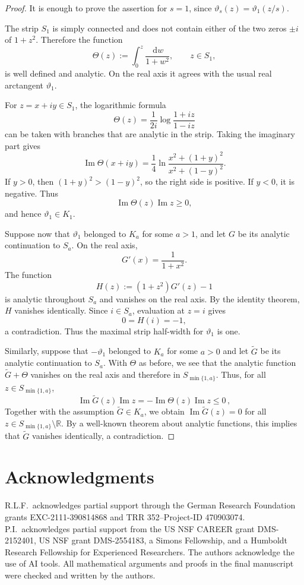 \documentclass[11pt]{article}
\theoremstyle{definition}
\theoremstyle{remark}
\newcommand{\R}{\mathbb{R}}
\newcommand{\dd}{\,\mathrm{d}}
\begin{document}
\begin{proof}
It is enough to prove the assertion for $s=1$, since $\vartheta_s(z)=\vartheta_1(z/s)$.

The strip $S_1$ is simply connected and does not contain either of the two zeros $\pm i$ of $1+z^2$.  Therefore the function
\[
\Theta(z):=\int_0^z\frac{\dd w}{1+w^2},
\qquad z\in S_1,
\]
is well defined and analytic.  On the real axis it agrees with the usual real arctangent $\vartheta_1$.

For $z=x+iy\in S_1$, the logarithmic formula
\[
\Theta(z)=\frac{1}{2i}\log\frac{1+iz}{1-iz}
\]
can be taken with branches that are analytic in the strip.  Taking the imaginary part gives
\begin{equation}\label{eq:Im-arctan}
\operatorname{Im}\Theta(x+iy)
=\frac14\ln
\frac{x^2+(1+y)^2}{x^2+(1-y)^2}.
\end{equation}
If $y>0$, then $(1+y)^2>(1-y)^2$, so the right side is positive.  If $y<0$, it is negative.  Thus
\[
\operatorname{Im}\Theta(z)\operatorname{Im}z\geq0,
\]
and hence $\vartheta_1\in K_1$.

Suppose now that $\vartheta_1$ belonged to $K_a$ for some $a>1$, and let $G$ be its analytic continuation to $S_a$.  On the real axis,
\[
G'(x)=\frac{1}{1+x^2}.
\]
The function
\[
H(z):=(1+z^2)G'(z)-1
\]
is analytic throughout $S_a$ and vanishes on the real axis.  By the identity theorem, $H$ vanishes identically.  Since $i\in S_a$, evaluation at $z=i$ gives
\[
0=H(i)=-1,
\]
a contradiction.  Thus the maximal strip half-width for $\vartheta_1$ is one.

Similarly, suppose that $-\vartheta_1$ belonged to $K_a$ for some $a>0$ and let $\tilde G$ be its analytic continuation to $S_a$. With $\Theta$ as before, we see that the analytic function $\tilde G+\Theta$ vanishes on the real axis and therefore in $S_{\min\{1,a\}}$. Thus, for all $z\in S_{\min\{1,a\}}$,
$$
\operatorname{Im} \tilde G(z)\operatorname{Im} z = -\operatorname{Im} \Theta(z)\operatorname{Im} z \leq 0 \,,
$$
Together with the assumption $\tilde G\in K_a$, we obtain $\operatorname{Im} \tilde G(z)=0$ for all $z\in S_{\min\{1,a\}}\setminus\R$. By a well-known theorem about analytic functions, this implies that $\tilde G$ vanishes identically, a contradiction.
\end{proof}


\section*{Acknowledgments}
R.L.F.~acknowledges partial support through the German Research Foundation grants EXC-2111-390814868 and TRR 352--Project-ID 470903074. P.I.~acknowledges partial support from the US NSF CAREER grant DMS-2152401, US NSF grant DMS-2554183, a Simons Fellowship, and a Humboldt Research Fellowship for Experienced Researchers. The authors acknowledge the use of AI tools. All mathematical arguments and proofs in the final manuscript were checked and written by the authors.
\end{document}
